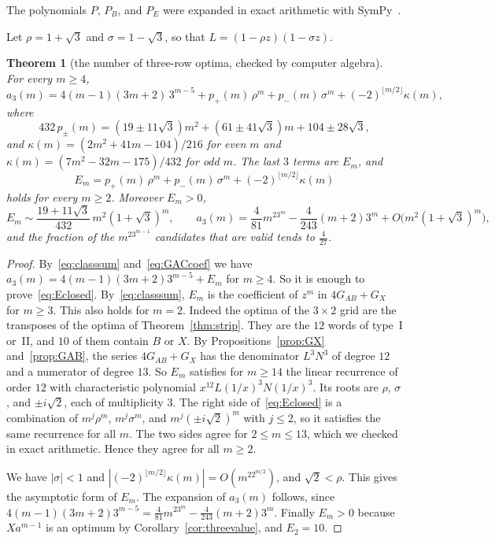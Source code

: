 \documentclass[12pt]{article}
\theoremstyle{plain}
\newtheorem{theorem}{Theorem}
\theoremstyle{definition}
\theoremstyle{remark}
\begin{document}
The polynomials $P$, $P_B$, and $P_E$ were expanded in exact arithmetic with
SymPy~\cite{sympy2017}.

Let $\rho=1+\sqrt3$ and $\sigma=1-\sqrt3$, so that $L=(1-\rho z)(1-\sigma z)$.

\begin{theorem}[the number of three-row optima, checked by computer algebra]\label{thm:threecount}
For every $m\ge4$,
\begin{equation}\label{eq:threecount}
a_3(m)=4(m-1)(3m+2)\,3^{m-5}+p_+(m)\,\rho^m+p_-(m)\,\sigma^m+(-2)^{\lfloor m/2\rfloor}\kappa(m),
\end{equation}
where
\[
432\,p_\pm(m)=(19\pm11\sqrt3)m^2+(61\pm41\sqrt3)m+104\pm28\sqrt3,
\]
and $\kappa(m)=(2m^2+41m-104)/216$ for even $m$ and
$\kappa(m)=(7m^2-32m-175)/432$ for odd $m$. The last $3$ terms are $E_m$, and
\begin{equation}\label{eq:Eclosed}
E_m=p_+(m)\,\rho^m+p_-(m)\,\sigma^m+(-2)^{\lfloor m/2\rfloor}\kappa(m)
\end{equation}
holds for every $m\ge2$. Moreover $E_m>0$,
\begin{equation}\label{eq:asymp1}
E_m\sim\frac{19+11\sqrt3}{432}\,m^2(1+\sqrt3)^m,\qquad
a_3(m)=\frac4{81}m^23^m-\frac4{243}(m+2)3^m+O\bigl(m^2(1+\sqrt3)^m\bigr),
\end{equation}
and the fraction of the $m^23^{m-1}$ candidates that are valid tends to
$\frac4{27}$.
\end{theorem}

\begin{proof}
By~\eqref{eq:classsum} and~\eqref{eq:GACcoef} we have
$a_3(m)=4(m-1)(3m+2)3^{m-5}+E_m$ for $m\ge4$. So it is enough to
prove~\eqref{eq:Eclosed}. By~\eqref{eq:classsum}, $E_m$ is the coefficient of
$z^m$ in $4G_{AB}+G_X$ for $m\ge3$. This also holds for $m=2$. Indeed the optima
of the $3\times2$ grid are the transposes of the optima of
Theorem~\ref{thm:strip}. They are the $12$ words of type~I or~II, and $10$ of
them contain $B$ or $X$. By Propositions~\ref{prop:GX} and~\ref{prop:GAB}, the
series $4G_{AB}+G_X$ has the denominator $L^3N^3$ of degree $12$ and a numerator
of degree $13$. So $E_m$ satisfies for $m\ge14$ the linear recurrence of order
$12$ with characteristic polynomial $x^{12}L(1/x)^3N(1/x)^3$. Its roots are
$\rho$, $\sigma$, and $\pm i\sqrt2$, each of multiplicity $3$. The right side
of~\eqref{eq:Eclosed} is a combination of $m^j\rho^m$, $m^j\sigma^m$, and
$m^j(\pm i\sqrt2)^m$ with $j\le2$, so it satisfies the same recurrence for all
$m$. The two sides agree for $2\le m\le13$, which we checked in exact
arithmetic. Hence they agree for all $m\ge2$.

We have $|\sigma|<1$ and $|(-2)^{\lfloor m/2\rfloor}\kappa(m)|=O(m^22^{m/2})$,
and $\sqrt2<\rho$. This gives the asymptotic form of $E_m$. The expansion of
$a_3(m)$ follows, since
$4(m-1)(3m+2)3^{m-5}=\frac4{81}m^23^m-\frac4{243}(m+2)3^m$. Finally $E_m>0$
because $Xa^{m-1}$ is an optimum by Corollary~\ref{cor:threevalue}, and
$E_2=10$.
\end{proof}
\end{document}
